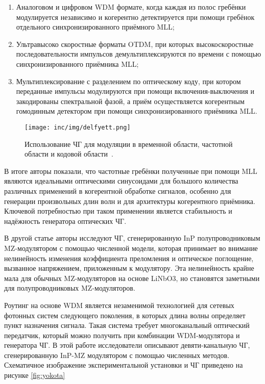 \begin{enumerate}
  \item Аналоговом и цифровом WDM формате, когда каждая из полос гребёнки модулируется независимо и когерентно детектируется при помощи гребёнок отдельного синхронизированного приёмного MLL;
  \item Ультравысоко скоростные форматы OTDM, при которых высокоскоростные последовательности импульсов демультиплексируются по времени с помощью синхронизированного приёмника MLL;
  \item Мультиплексирование с разделением по оптическому коду, при котором переданные импульсы модулируются при помощи включения\--выключения и закодированы спектральной фазой, а приём осуществляется когерентным гомодинным детектором при помощи синхронизированного приёмника MLL.
\end{enumerate}

\begin{figure}[ht]
  \centering
  \texttt{[image: inc/img/delfyett.png]}
  \caption{Использование ЧГ для модуляции в временной области, частотной области и кодовой области~\cite{Delfyett2006}.}
  \label{fig:delfyett}
\end{figure}

В итоге авторы показали, что частотные гребёнки полученные при помощи MLL являются идеальными оптическими синусоидами для большого количества различных применений в когерентной обработке сигналов, особенно для генерации произвольных длин волн и для архитектуры когерентного приёмника. Ключевой потребностью при таком применении является стабильность и надёжность генератора оптических ЧГ. 

В другой статье \cite{Yokota2015} авторы исследуют ЧГ, сгенерированную InP полупроводниковым MZ-модулятором с помощью численной модели, которая принимает во внимание нелинейность изменения коэффициента преломления и оптическое поглощение, вызванное напряжением, приложенным к модулятору. Эта нелинейность крайне мала для обычных MZ-модуляторов на основе LiNbO3, но становятся заметными для полупроводниковых MZ-модуляторов. 

Роутинг на основе WDM является незаменимой технологией для сетевых фотонных систем следующего поколения, в которых длина волны определяет пункт назначения сигнала. Такая система требует многоканальный оптический передатчик, который можно получить при комбинации WDM-модулятора и генератора ЧГ. В этой работе исследователи описывают девяти-канальную ЧГ, сгенерированную InP-MZ модулятором с помощью численных методов. Схематичное изображение экспериментальной установки и ЧГ приведено на рисунке \ref{fig:yokota}

